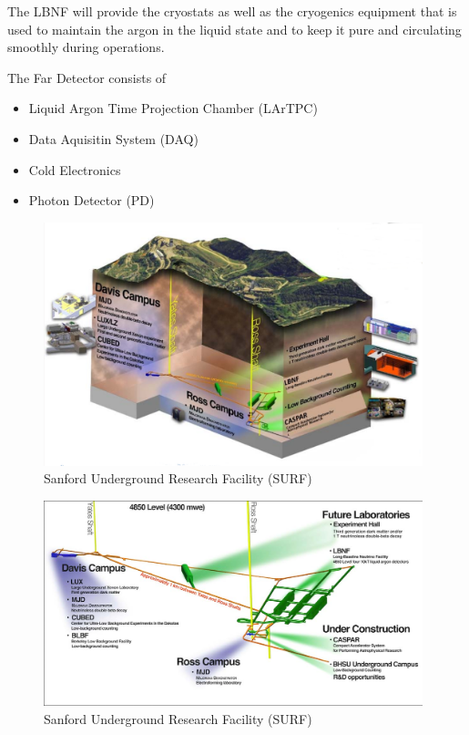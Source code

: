 The LBNF will provide the cryostats as well as the cryogenics equipment that is used to maintain the argon in the liquid state and to keep it pure and circulating smoothly during operations. 

The Far Detector consists of 
\begin{itemize}
  \item Liquid Argon Time Projection Chamber (LArTPC)
  \item Data Aquisitin System (DAQ)
  \item Cold Electronics
  \item Photon Detector (PD)
\end{itemize}

\begin{figure}
\caption{Sanford Underground Research Facility (SURF)}
\label{fig:farDetector_SURF1}
\centering
\includegraphics[width=0.98\textwidth, keepaspectratio=true]{figs/farDetector_SanfordUndergroundResearchFacility.png}
\end{figure}

\begin{figure}
\caption{Sanford Underground Research Facility (SURF)}
\label{fig:farDetector_SURF2}
\centering
\includegraphics[width=0.98\textwidth, keepaspectratio=true]{figs/farDetector_wholeLab.png}
\end{figure}

